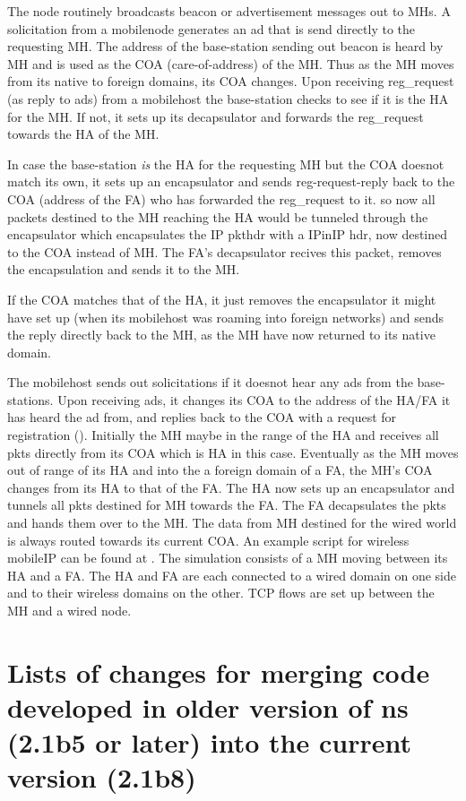 The  node routinely broadcasts beacon or
advertisement messages out to MHs. A solicitation from a mobilenode
generates an ad that is send directly to the requesting MH. The
address of the base-station sending out beacon is heard by 
MH and is used as the COA (care-of-address) of the MH. Thus as the MH
moves from its native to foreign domains, its COA changes. 
Upon receiving  reg\_request (as reply to ads) from a mobilehost the
base-station checks to see if it is the HA for the MH. If not, it sets
up its decapsulator and forwards the reg\_request towards the HA of
the MH. 

In case the base-station {\em is} the HA for the requesting MH but the
COA doesnot match its own, it sets up an encapsulator and sends
reg-request-reply back to the COA (address of the FA) who has
forwarded the reg\_request to it. so now all packets destined to the
MH reaching the HA would be tunneled through the encapsulator which
encapsulates the IP pkthdr with a IPinIP hdr, now destined to the COA
instead of MH. The FA's decapsulator recives this packet, removes the
encapsulation and sends it to the MH.

If the COA matches that of the HA, it just removes the encapsulator it
might have set up (when its mobilehost was roaming into foreign
networks) and sends the reply directly back to the MH, as the MH have
now returned to its native domain.

The mobilehost sends out solicitations if it doesnot hear any ads from the
base-stations. Upon receiving ads, it changes its COA to the address of
the HA/FA it has heard the ad from, and replies back to the COA with a
request for registration ().
Initially the MH maybe in the range of the HA and receives all pkts
directly from its COA which is HA in this case. 
Eventually as the MH moves out of range of its HA and into the a foreign
domain of a FA, the MH's COA changes from its HA to that of the FA. The HA
now sets up an encapsulator and tunnels all pkts destined for MH towards
the FA. The FA decapsulates the pkts and hands them over to the MH. The
data from MH destined for the wired world is always routed towards its
current COA.  
An example script for wireless mobileIP can be found at
. The simulation consists of a MH moving
between its HA and a FA. The HA and FA are each connected to a wired
domain on one side and to their wireless domains on the other. TCP flows
are set up between the MH and a wired node. 


\section{Lists of changes for merging code developed in older version of ns (2.1b5 or later) into the current version (2.1b8) }
\label{old-merge}


